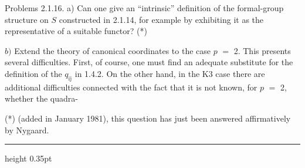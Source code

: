 \documentclass[9pt]{article}
\newcommand{\CanonText}[1]{\par{\fontsize{8.0}{9.35}\selectfont\RaggedRight #1\par}\vspace{2.2pt}}
\begin{document}
\begin{minipage}[t][\dimexpr\textheight-5pt\relax][t]{\textwidth}
\CanonText{Problems 2.1.16. a) Can one give an “intrinsic” definition of the formal-group structure on \(S\) constructed in 2.1.14, for example by exhibiting it as the representative of a suitable functor? (*)}
\CanonText{\(b)\) Extend the theory of canonical coordinates to the case \(p\) \(=\) 2. This presents several difficulties. First, of course, one must find an adequate substitute for the definition of the \(q_{\mathrm{ij}}\) in 1.4.2. On the other hand, in the K3 case there are additional difficulties connected with the fact that it is not known, for \(p\) \(=\) 2, whether the quadra-}
\CanonText{(*) (added in January 1981), this question has just been answered affirmatively by Nygaard.}
\vfill
{\color{Accent}\hrule height 0.35pt}\vspace{3pt}
\end{minipage}
\newpage
\end{document}
